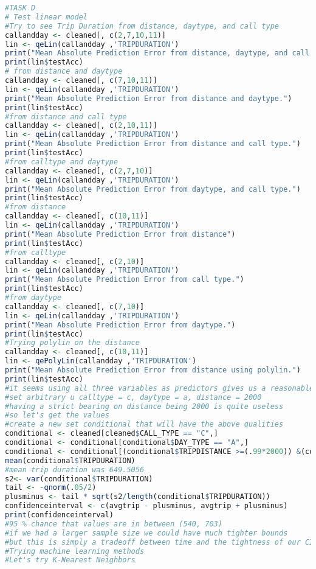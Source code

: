 \documentclass{article}
\begin{document}
\begin{lstlisting}[language=R]
#TASK D
# Test linear model
#Try to see Trip Duration from distance, daytype, and call type
callandday <- cleaned[, c(2,7,10,11)]
lin <- qeLin(callandday ,'TRIPDURATION')
print("Mean Absolute Prediction Error from distance, daytype, and call type.")
print(lin$testAcc)
# from distance and daytype
callandday <- cleaned[, c(7,10,11)]
lin <- qeLin(callandday ,'TRIPDURATION')
print("Mean Absolute Prediction Error from distance and daytype.")
print(lin$testAcc)
#from distance and call type
callandday <- cleaned[, c(2,10,11)]
lin <- qeLin(callandday ,'TRIPDURATION')
print("Mean Absolute Prediction Error from distance and call type.")
print(lin$testAcc)
#from calltype and daytype
callandday <- cleaned[, c(2,7,10)]
lin <- qeLin(callandday ,'TRIPDURATION')
print("Mean Absolute Prediction Error from daytype, and call type.")
print(lin$testAcc)
#from distance
callandday <- cleaned[, c(10,11)]
lin <- qeLin(callandday ,'TRIPDURATION')
print("Mean Absolute Prediction Error from distance")
print(lin$testAcc)
#from calltype
callandday <- cleaned[, c(2,10)]
lin <- qeLin(callandday ,'TRIPDURATION')
print("Mean Absolute Prediction Error from call type.")
print(lin$testAcc)
#from daytype
callandday <- cleaned[, c(7,10)]
lin <- qeLin(callandday ,'TRIPDURATION')
print("Mean Absolute Prediction Error from daytype.")
print(lin$testAcc)
#Trying polylin on the distance
callandday <- cleaned[, c(10,11)]
lin <- qePolyLin(callandday ,'TRIPDURATION')
print("Mean Absolute Prediction Error from distance using polylin.")
print(lin$testAcc)
#it seems using all three variables as predictors gives us a reasonable error so lets use that as our model
#set arbitrary u calltype = c, daytype = a, distance = 2000
#having a strict bearing on distance being 2000 is quite useless
#so let's get the values 
#create a new set conditional that will have the above qualities
conditional <- cleaned[cleaned$CALL_TYPE == "C",]
conditional <- conditional[conditional$DAY_TYPE == "A",]
conditional <- conditional[(conditional$TRIPDISTANCE >=(.99*2000)) &(conditional$TRIPDISTANCE <= (1.01*2000)),]
mean(conditional$TRIPDURATION)
#mean trip duration was 649.5056
s2<- var(conditional$TRIPDURATION)
tail <- -qnorm(.05/2)
plusminus <- tail * sqrt(s2/length(conditional$TRIPDURATION))
confidenceinterval <- c(avgtrip - plusminus, avgtrip + plusminus)
print(confidenceinterval)
#95 % chance that values are in between (540, 703)
#if we had a larger sample size we could have much tighter bounds
#but this is simply a tradeoff between time and the tightness of our CI
#Trying machine learning methods
#Let's try K-Nearest Neighbors

\end{lstlisting}
\end{document}

